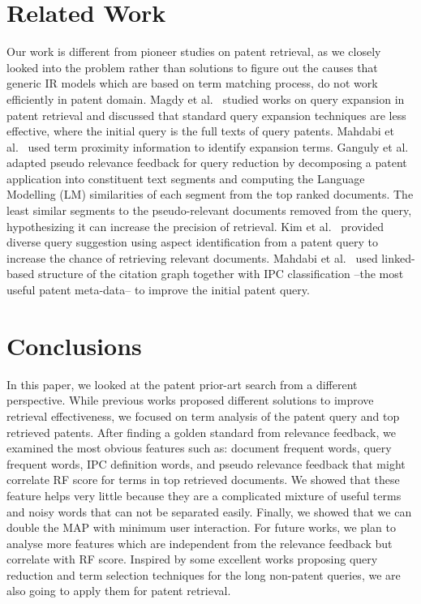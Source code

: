 \documentclass{sig-alternate}
\begin{document}
\section{Related Work}
Our work is different from pioneer studies on patent retrieval, as we closely looked into the problem rather than solutions to figure out the causes that generic IR models which are based on term matching process, do not work efficiently in patent domain. Magdy et al.~\cite{magdy2011study} studied works on query expansion in patent retrieval and discussed that standard query expansion techniques are less effective, where the initial query is the full texts of query patents. Mahdabi et al.~\cite{Mahdabi2013} used term proximity information to identify expansion terms. Ganguly et al.~\cite{ganguly2011patent} adapted pseudo relevance feedback for query reduction by decomposing a patent application into constituent text segments and computing the Language Modelling (LM) similarities of each segment from the top ranked documents. The least similar segments to the pseudo-relevant documents removed from the query, hypothesizing it can increase the precision of retrieval. Kim et al.~\cite{kim2014diversifying} provided diverse query suggestion using aspect identification from a patent query to increase the chance of retrieving relevant documents. Mahdabi et al.~\cite{mahdabi2014patent} used linked-based structure of the citation graph together with IPC classification --the most useful patent meta-data-- to improve the initial patent query. 
\section{Conclusions}
In this paper, we looked at the patent prior-art search from a different perspective. While previous works proposed different solutions to improve retrieval effectiveness, we focused on term analysis of the patent query and top retrieved patents. After finding a golden standard from relevance feedback, we examined the most obvious features such as: document frequent words, query frequent words, IPC definition words, and pseudo relevance feedback that might correlate RF score for terms in top retrieved documents. We showed that these feature helps very little because they are a complicated mixture of useful terms and noisy words that can not be separated easily. Finally, we showed that we can double the MAP with minimum user interaction. 
For future works, we plan to analyse more features which are independent from the relevance feedback but correlate with RF score. Inspired by some excellent works proposing query reduction and term selection techniques for the long non-patent queries\cite{maxwell2013compact}\cite{kumaran2009reducing}, we are also going to apply them for patent retrieval.   
\end{document}
